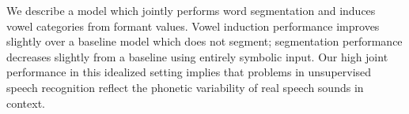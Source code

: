 We describe a model which jointly performs word segmentation and induces vowel categories from formant values. Vowel induction performance improves slightly over a baseline model which does not segment; segmentation performance decreases slightly from a baseline using entirely symbolic input. Our high joint performance in this idealized setting implies that problems in unsupervised speech recognition reflect the phonetic variability of real speech sounds in context.
